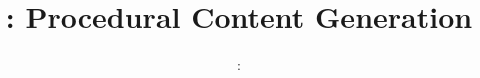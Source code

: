 \usepackage{../../beamerthemeFalmouthGamesAcademy}
\usepackage{multimedia}
\graphicspath{ {../../} }


\usepackage[normalem]{ulem}
\usepackage{wasysym}

\usepackage{pdfpages}

\usetikzlibrary{arrows,automata}




\title{\sessionnumber: Procedural Content Generation}
\subtitle{\modulecode: \moduletitle}

\frame{\titlepage} 












